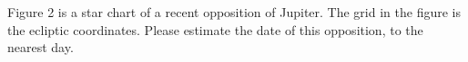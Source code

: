 Figure 2 is a star chart of a recent opposition of Jupiter. The grid in the
figure is the ecliptic coordinates. Please estimate the date of this
opposition, to the nearest day.

